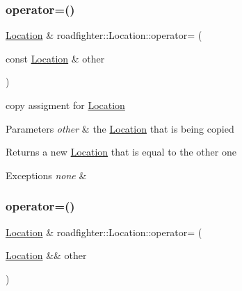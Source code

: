\subsubsection{\texorpdfstring{operator=()}{operator=()}\hspace{0.1cm}{\footnotesize\ttfamily [1/2]}}
{\footnotesize\ttfamily \hyperlink{classroadfighter_1_1Location}{Location} \& roadfighter\+::\+Location\+::operator= (\begin{DoxyParamCaption}\item[{const \hyperlink{classroadfighter_1_1Location}{Location} \&}]{other }\end{DoxyParamCaption})\hspace{0.3cm}{\ttfamily [default]}}

copy assigment for \hyperlink{classroadfighter_1_1Location}{Location} 
\begin{DoxyParams}{Parameters}
{\em other} & the \hyperlink{classroadfighter_1_1Location}{Location} that is being copied \\
\hline
\end{DoxyParams}
\begin{DoxyReturn}{Returns}
a new \hyperlink{classroadfighter_1_1Location}{Location} that is equal to the other one 
\end{DoxyReturn}

\begin{DoxyExceptions}{Exceptions}
{\em none} & \\
\hline
\end{DoxyExceptions}
\mbox{\label{classroadfighter_1_1Location_a638a7648859525b0f56cc2fcc49de6f2}} 
\subsubsection{\texorpdfstring{operator=()}{operator=()}\hspace{0.1cm}{\footnotesize\ttfamily [2/2]}}
{\footnotesize\ttfamily \hyperlink{classroadfighter_1_1Location}{Location} \& roadfighter\+::\+Location\+::operator= (\begin{DoxyParamCaption}\item[{\hyperlink{classroadfighter_1_1Location}{Location} \&\&}]{other }\end{DoxyParamCaption})\hspace{0.3cm}{\ttfamily [noexcept]}}

